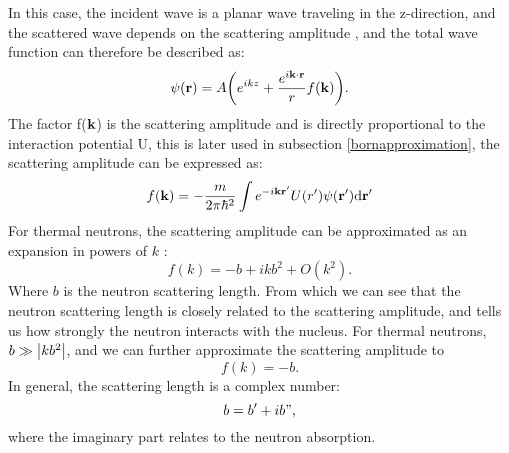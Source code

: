In this case, the incident wave is a planar wave traveling in the z-direction, and the scattered wave depends on the scattering amplitude \cite{thomas_ederth}, and the total wave function can therefore be described as:
\begin{equation}\label{schrodinger_general}
	\psi(\vb{r}) = A\qty(e^{ikz} + \frac{e^{i\vb{k}\cdot\vb{r}}}{r}f(\vb{k})).
\end{equation}
The factor f($\vb{k}$) is the scattering amplitude and is directly proportional to the interaction potential U, this is later used in subsection \ref{bornapproximation}, the scattering amplitude can be expressed as:
\begin{equation}
	f(\vb{k}) = - \frac{m}{2\pi\hbar^2}\int e^{-i \vb{k} \vb{r}'}U(r')\psi(\vb{r}')\dd \vb{r}'
\end{equation}
For thermal neutrons, the scattering amplitude can be approximated as an expansion in powers of $k$ \cite{cross_section_detailed}:
\begin{equation}\label{scat_amplitude_expansion}
	f(k) = -b + ikb^2 + O(k^2).
\end{equation}
Where $b$ is the neutron scattering length. From which we can see that the neutron scattering length is closely related to the scattering amplitude, and tells us how strongly the neutron interacts with the nucleus. For thermal neutrons, $b \gg \abs{kb^2}$, and we can further approximate the scattering amplitude to 
\begin{equation}
	f(k) = -b.
\end{equation}
In general, the scattering length is a complex number:
\begin{equation}\label{scattering_length_complex}
	b = b' + ib",
\end{equation}
where the imaginary part relates to the neutron absorption. 
\clearpage
